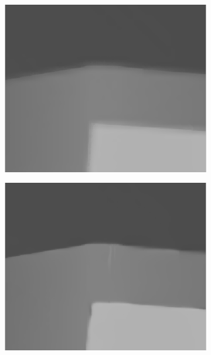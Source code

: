 \documentclass[preprint,10pt,5p,times,twocolumn]{elsarticle}
\begin{document}
\begin{figure}[t]
\begin{center}
\begin{subfigure}[b]{0.136\linewidth}
\end{subfigure}
\begin{subfigure}[b]{0.136\linewidth}
    \includegraphics[width=\linewidth]{cmp_book_8X_JBL_part.png}
    \label{fig:}
\end{subfigure}
\begin{subfigure}[b]{0.136\linewidth}
    \includegraphics[width=\linewidth]{cmp_book_8X_AR_part.png}
    \label{fig:} %
\end{subfigure}
\begin{subfigure}[b]{0.136\linewidth}

\end{subfigure}
\end{center}
\end{figure}
\end{document}
